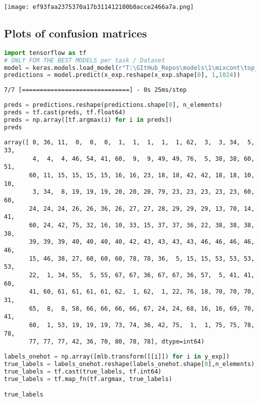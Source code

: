 \texttt{[image: ef93faa2375370a17b311412100b0acce2466a7a.png]}

\hypertarget{plots-of-confusion-matrices}{%
\subsection*{Plots of confusion
matrices}\label{plots-of-confusion-matrices}}

\begin{lstlisting}[language=Python]
import tensorflow as tf
# ONLY FOR THE BEST MODELS per task / Dataset
model = keras.models.load_model(r"T:\GItHub_Repos\models\1\mixcont\top_layer\models\simple_cnn_dct_top_layer.h5")
predictions = model.predict(x_exp.reshape(x_exp.shape[0], 1,1024))
\end{lstlisting}

\begin{lstlisting}
7/7 [==============================] - 0s 25ms/step
\end{lstlisting}

\begin{lstlisting}[language=Python]
preds = predictions.reshape(predictions.shape[0], n_elements)
preds = tf.cast(preds, tf.float64)
preds = np.array([tf.argmax(i) for i in preds])
preds
\end{lstlisting}

\begin{lstlisting}
array([ 0, 36, 11,  0,  0,  0,  1,  1,  1,  1,  1, 62,  3,  3, 34,  5, 33,
        4,  4,  4, 46, 54, 41, 60,  9,  9, 49, 49, 76,  5, 38, 38, 60, 51,
       60, 11, 15, 15, 15, 15, 16, 16, 23, 18, 18, 42, 42, 18, 18, 10, 10,
        3, 34,  8, 19, 19, 19, 20, 20, 20, 79, 23, 23, 23, 23, 23, 60, 60,
       24, 24, 24, 26, 26, 36, 26, 27, 27, 28, 29, 29, 29, 13, 70, 14, 41,
       60, 24, 42, 75, 32, 16, 10, 33, 15, 37, 37, 36, 22, 38, 38, 38, 38,
       39, 39, 39, 40, 40, 40, 40, 42, 43, 43, 43, 43, 46, 46, 46, 46, 46,
       15, 46, 38, 27, 60, 60, 60, 78, 78, 36,  5, 15, 15, 53, 53, 53, 53,
       22,  1, 34, 55,  5, 55, 67, 67, 36, 67, 67, 36, 57,  5, 41, 41, 60,
       41, 60, 61, 61, 61, 61, 62,  1, 62,  1, 22, 76, 18, 70, 70, 70, 31,
       65,  8,  8, 58, 66, 66, 66, 66, 67, 24, 24, 68, 16, 16, 69, 70, 41,
       60,  1, 53, 19, 19, 19, 73, 74, 36, 42, 75,  1,  1, 75, 75, 78, 78,
       77, 77, 77, 42, 36, 70, 80, 78, 78], dtype=int64)
\end{lstlisting}

\begin{lstlisting}[language=Python]
labels_onehot = np.array([mlb.transform([[i]]) for i in y_exp])
true_labels = labels_onehot.reshape(labels_onehot.shape[0],n_elements)
true_labels = tf.cast(true_labels, tf.int64)
true_labels = tf.map_fn(tf.argmax, true_labels)

true_labels
\end{lstlisting}

